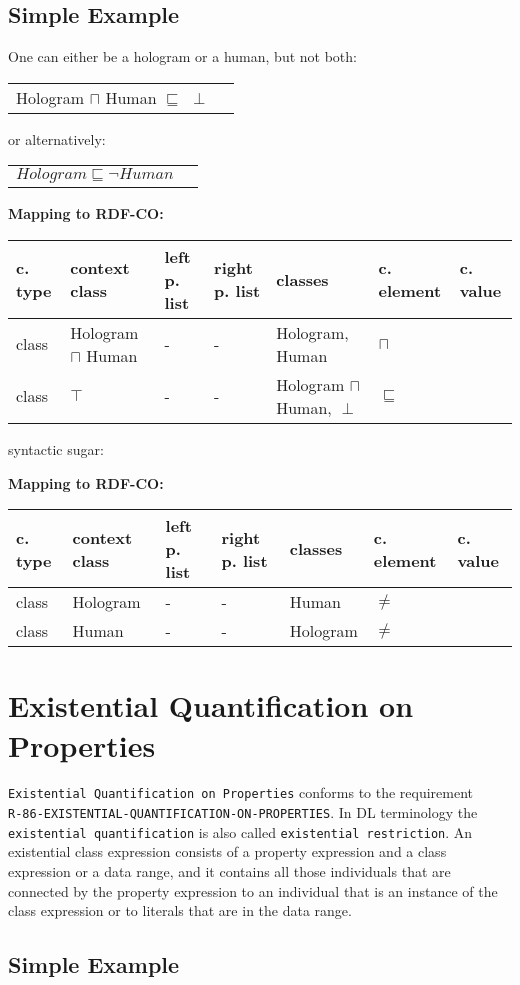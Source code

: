 \documentclass{llncs}
\newcommand{\ms}[1]{\texttt{#1}}
\newenvironment{gcotable}{
  \scriptsize
  \sffamily
  \vspace{0cm}
	\begin{center}
	\textbf{\vspace{0.4cm}Mapping to RDF-CO:} \\
  \begin{tabular}{l|l|l|l|l|l|l}
	\hline
  \textbf{c. type} & \textbf{context class} & \textbf{left p. list} & \textbf{right p. list} & \textbf{classes} & \textbf{c. element} & \textbf{c. value} \\
  \hline

}{
  \hline
  \end{tabular}
	\end{center}
}
\newenvironment{DL}{
  \vspace{0cm}
	\begin{center}
  \begin{tabular}{r l}

}{
  \end{tabular}
	\end{center}
}
\begin{document}
\subsection{Simple Example}

One can either be a hologram or a human, but not both:

\begin{DL}
Hologram $\sqcap$ Human $\sqsubseteq$ $\perp$\\
\end{DL}

or alternatively:

\begin{DL}
$Hologram \sqsubseteq \neg Human$
\end{DL}

\begin{gcotable}
class & Hologram $\sqcap$ Human & - & - & Hologram, Human & $\sqcap$  \\
class & $\top$ & - & - & Hologram $\sqcap$ Human, $\perp$ & $\sqsubseteq$ \\
\end{gcotable}

syntactic sugar:

\begin{gcotable}
class & Hologram & - & - & Human & $\ne$ \\
class & Human & - & - & Hologram & $\ne$ \\
\end{gcotable}

\section{Existential Quantification on Properties}

\ms{Existential Quantification on Properties} conforms to the requirement \\
\ms{R-86-EXISTENTIAL-QUANTIFICATION-ON-PROPERTIES}.
In DL terminology the \ms{existential quantification} is also called \ms{existential restriction}.
An existential class expression consists of a property expression and a class expression or a data range, and it contains all those individuals that are connected by the property expression to an individual that is an instance of the class expression or to literals that are in the data range.  

\subsection{Simple Example}
\end{document}
